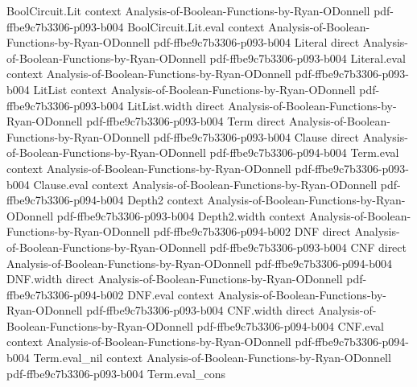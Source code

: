 \begin{lemma}
\label{BoolFourier.expectation_char_empty}
\leanok
{}
\proofstep
  {BoolCircuit.Lit}
  {context}
  {Analysis-of-Boolean-Functions-by-Ryan-ODonnell}
  {pdf-ffbe9c7b3306-p093-b004}
\proofstep
  {BoolCircuit.Lit.eval}
  {context}
  {Analysis-of-Boolean-Functions-by-Ryan-ODonnell}
  {pdf-ffbe9c7b3306-p093-b004}
\proofstep
  {Literal}
  {direct}
  {Analysis-of-Boolean-Functions-by-Ryan-ODonnell}
  {pdf-ffbe9c7b3306-p093-b004}
\proofstep
  {Literal.eval}
  {context}
  {Analysis-of-Boolean-Functions-by-Ryan-ODonnell}
  {pdf-ffbe9c7b3306-p093-b004}
\proofstep
  {LitList}
  {context}
  {Analysis-of-Boolean-Functions-by-Ryan-ODonnell}
  {pdf-ffbe9c7b3306-p093-b004}
\proofstep
  {LitList.width}
  {direct}
  {Analysis-of-Boolean-Functions-by-Ryan-ODonnell}
  {pdf-ffbe9c7b3306-p093-b004}
\proofstep
  {Term}
  {direct}
  {Analysis-of-Boolean-Functions-by-Ryan-ODonnell}
  {pdf-ffbe9c7b3306-p093-b004}
\proofstep
  {Clause}
  {direct}
  {Analysis-of-Boolean-Functions-by-Ryan-ODonnell}
  {pdf-ffbe9c7b3306-p094-b004}
\proofstep
  {Term.eval}
  {context}
  {Analysis-of-Boolean-Functions-by-Ryan-ODonnell}
  {pdf-ffbe9c7b3306-p093-b004}
\proofstep
  {Clause.eval}
  {context}
  {Analysis-of-Boolean-Functions-by-Ryan-ODonnell}
  {pdf-ffbe9c7b3306-p094-b004}
\proofstep
  {Depth2}
  {context}
  {Analysis-of-Boolean-Functions-by-Ryan-ODonnell}
  {pdf-ffbe9c7b3306-p093-b004}
\proofstep
  {Depth2.width}
  {context}
  {Analysis-of-Boolean-Functions-by-Ryan-ODonnell}
  {pdf-ffbe9c7b3306-p094-b002}
\proofstep
  {DNF}
  {direct}
  {Analysis-of-Boolean-Functions-by-Ryan-ODonnell}
  {pdf-ffbe9c7b3306-p093-b004}
\proofstep
  {CNF}
  {direct}
  {Analysis-of-Boolean-Functions-by-Ryan-ODonnell}
  {pdf-ffbe9c7b3306-p094-b004}
\proofstep
  {DNF.width}
  {direct}
  {Analysis-of-Boolean-Functions-by-Ryan-ODonnell}
  {pdf-ffbe9c7b3306-p094-b002}
\proofstep
  {DNF.eval}
  {context}
  {Analysis-of-Boolean-Functions-by-Ryan-ODonnell}
  {pdf-ffbe9c7b3306-p093-b004}
\proofstep
  {CNF.width}
  {direct}
  {Analysis-of-Boolean-Functions-by-Ryan-ODonnell}
  {pdf-ffbe9c7b3306-p094-b004}
\proofstep
  {CNF.eval}
  {context}
  {Analysis-of-Boolean-Functions-by-Ryan-ODonnell}
  {pdf-ffbe9c7b3306-p094-b004}
\proofstep
  {Term.eval_nil}
  {context}
  {Analysis-of-Boolean-Functions-by-Ryan-ODonnell}
  {pdf-ffbe9c7b3306-p093-b004}
\proofstep
  {Term.eval_cons}

\end{lemma}
